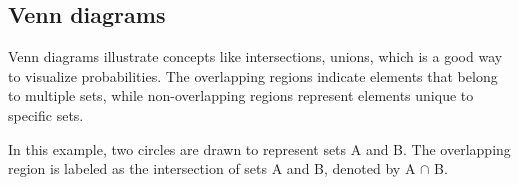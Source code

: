\documentclass{article}
\begin{document}
\subsection{Venn diagrams}
\begin{minipage}{0.65\textwidth}
    Venn diagrams illustrate concepts like intersections, unions, which is a good way to visualize probabilities. The overlapping regions indicate elements that belong to multiple sets, while non-overlapping regions represent elements unique to specific sets. 

    In this example, two circles are drawn to represent sets A and B. The overlapping region is labeled as the intersection of sets A and B, denoted by A $\cap$ B.
\end{minipage}
\hfill
\begin{minipage}{0.3\textwidth}
\end{minipage}
\end{document}
